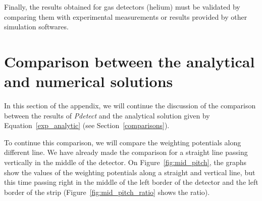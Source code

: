 \documentclass[11pt]{article}
\begin{document}
		Finally, the results obtained for gas detectors (helium) must be validated
		by comparing them with experimental measurements or results provided by other
		simulation softwares.


\newpage

\appendix

\section{Comparison between the analytical and numerical solutions} \label{App:comp_an}

	In this section of the appendix, we will continue the discussion of the comparison
	between the results of \textit{Pdetect} and the analytical solution given by
	Equation~\ref{exp_analytic} (see Section~\ref{comparisons}).

	To continue this comparison, we will compare the weighting potentials along different line.
	We have already made the comparison for a straight line passing vertically in the middle of the
	detector. On Figure~\ref{fig:mid_pitch}, the graphs show the values of the weighting potentials along a
	straight and vertical line, but this time passing right in the middle of the left border of
	the detector and the left border of the strip (Figure~\ref{fig:mid_pitch_ratio} shows the ratio).
\end{document}
